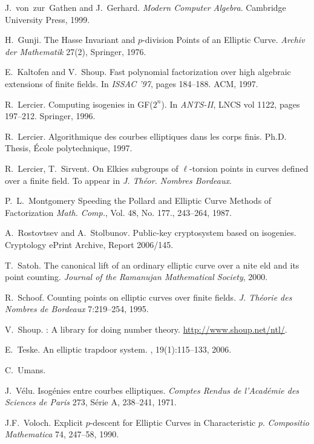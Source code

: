 \begin{thebibliography}{AAAA00}
  J.~von~zur~Gathen and J.~Gerhard. 
  \newblock \emph{Modern Computer Algebra}. 
  \newblock Cambridge University Press, 1999.

H.~Gunji.
    \newblock The Hasse Invariant and $p$-division Points of an Elliptic Curve.
  \newblock \emph{Archiv der Mathematik} 27(2), Springer, 1976.

  E.~Kaltofen and V.~Shoup.
  \newblock Fast polynomial factorization over high algebraic extensions
  of finite fields.
  \newblock In \emph{ISSAC '97}, pages 184--188. ACM, 1997.

  R.~Lercier.
  \newblock Computing isogenies in GF($2^n$).
  \newblock In {\em ANTS-II}, LNCS vol 1122, pages 197--212. Springer, 1996.

  R.~Lercier.
  \newblock Algorithmique des courbes elliptiques dans les corps finis. 
  \newblock Ph.D. Thesis, {\'E}cole polytechnique, 1997.

  R.~Lercier, T.~Sirvent.
  \newblock On Elkies subgroups of $\ell$-torsion points in curves defined over
  a finite field.
  \newblock To appear in {\em J. Th\'eor. Nombres Bordeaux}.

  P.~L.~Montgomery
  \newblock Speeding the Pollard and Elliptic Curve Methods of Factorization
  \newblock \emph{Math. Comp.}, Vol. 48, No. 177., 243--264, 1987.

  A.~Rostovtsev and A.~Stolbunov.
  \newblock Public-key cryptosystem based on isogenies.
  \newblock Cryptology ePrint Archive, Report 2006/145.
  
  T.~Satoh.
  \newblock The canonical lift of an ordinary elliptic curve over a nite eld and its point counting.
  \newblock \emph{Journal of the Ramanujan Mathematical Society}, 2000.

  R.~Schoof.
  \newblock Counting points on elliptic curves over finite fields.
  \newblock \emph{J. Théorie des Nombres de Bordeaux} 7:219--254, 1995.

  V.~Shoup.
  : A library for doing number theory.
  \newblock \url{http://www.shoup.net/ntl/}.

  E.~Teske.
  \newblock An elliptic trapdoor system.
  , 19(1):115--133, 2006.

  C.~Umans.
  \newblock \todo
  \newblock \todo

J.~V\'elu.
  \newblock Isogénies entre courbes elliptiques.
  \newblock \emph{Comptes Rendus de l'Académie des Sciences de Paris} 273,
  Série A, 238--241, 1971.

J.F.~Voloch.
  \newblock Explicit $p$-descent for Elliptic Curves in Characteristic $p$.
  \newblock \emph{Compositio Mathematica} 74, 247--58, 1990.
  
\end{thebibliography}
